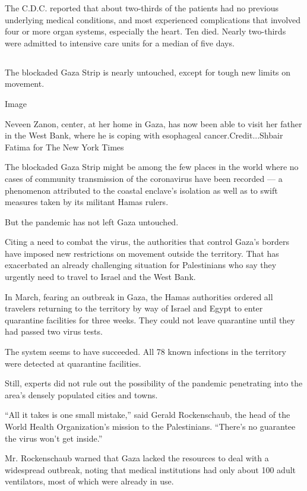 The C.D.C. reported that about two-thirds of the patients had no
previous underlying medical conditions, and most experienced
complications that involved four or more organ systems, especially the
heart. Ten died. Nearly two-thirds were admitted to intensive care units
for a median of five days.

\hypertarget{section-7}{%
\subsection{}\label{section-7}}

The blockaded Gaza Strip is nearly untouched, except for tough new
limits on movement.

Image

Neveen Zanon, center, at her home in Gaza, has now been able to visit
her father in the West Bank, where he is coping with esophageal
cancer.Credit...Shbair Fatima for The New York Times

The blockaded Gaza Strip might be among the few places in the world
where no cases of community transmission of the coronavirus have been
recorded --- a phenomenon attributed to the coastal enclave's isolation
as well as to swift measures taken by its militant Hamas rulers.

But the pandemic has not left Gaza untouched.

Citing a need to combat the virus, the authorities that control Gaza's
borders have imposed new restrictions on movement outside the territory.
That has exacerbated an already challenging situation for Palestinians
who say they urgently need to travel to Israel and the West Bank.

In March, fearing an outbreak in Gaza, the Hamas authorities ordered all
travelers returning to the territory by way of Israel and Egypt to enter
quarantine facilities for three weeks. They could not leave quarantine
until they had passed two virus tests.

The system seems to have succeeded. All 78 known infections in the
territory were detected at quarantine facilities.

Still, experts did not rule out the possibility of the pandemic
penetrating into the area's densely populated cities and towns.

``All it takes is one small mistake,'' said Gerald Rockenschaub, the
head of the World Health Organization's mission to the Palestinians.
``There's no guarantee the virus won't get inside.''

Mr. Rockenschaub warned that Gaza lacked the resources to deal with a
widespread outbreak, noting that medical institutions had only about 100
adult ventilators, most of which were already in use.

